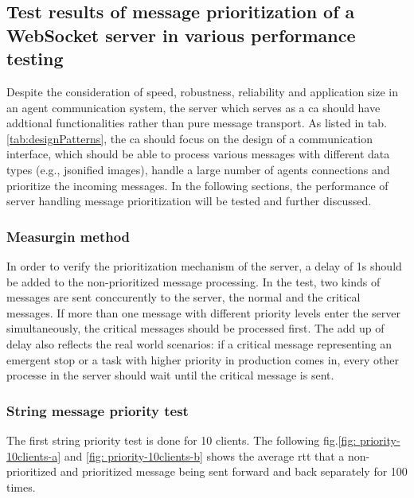 \subsection{Test results of message prioritization of a WebSocket server in various 
performance testing} \label{chap: Result-priority}
Despite the consideration of speed, robustness, reliability and application size in an agent 
communication system, the server which serves as a \gls{ca} should have addtional 
functionalities rather than pure message transport. As listed in tab.\ref{tab:designPatterns}, 
the \gls{ca} should focus on the design of a communication interface, which should be able to 
process various messages with different data types (e.g., jsonified images), handle a large 
number of agents connections and prioritize the incoming messages. In the following sections, 
the performance of server handling message prioritization will be tested and further discussed.  
\subsubsection{Measurgin method}
In order to verify the prioritization mechanism of the server, a delay of 1s should be added to the 
non-prioritized message processing. In the test, two kinds of messages are sent conccurently to the server, 
the normal and the critical messages. If more than one message with different priority levels 
enter the server simultaneously, the critical messages should be processed first. The add up of 
delay also reflects the real world scenarios: if a critical message representing an emergent stop 
or a task with higher priority in production comes in, every other processe in the server 
should wait until the critical message is sent. 
\subsubsection{String message priority test}
The first string priority test is done for 10 clients. The following fig.\ref{fig: priority-10clients-a} 
and \ref{fig: priority-10clients-b} shows the average \gls{rtt} 
that a non-prioritized and prioritized message being sent forward and back separately for 100 times.



